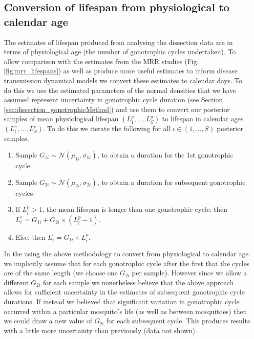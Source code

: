 \documentclass[12pt]{article}
\begin{document}
{\subsection{Conversion of lifespan from physiological to calendar age}\label{sec:dissection_conversion}
The estimates of lifespan produced from analysing the dissection data are in terms of physiological age (the number of gonotrophic cycles undertaken). To allow comparison with the estimates from the MRR studies (Fig. \ref{fig:mrr_lifespans}) as well as produce more useful estimates to inform disease transmission dynamical models we convert these estimates to calendar days. To do this we use the estimated parameters of the normal densities that we have assumed represent uncertainty in gonotrophic cycle duration (see Section \ref{sec:dissection_gonotrophicMethod}) and use them to convert our posterior samples of mean physiological lifespan $(L^p_1,...,L^p_S)$ to lifespan in calendar ages $(L^c_1,...,L^c_S)$. To do this we iterate the following for all $i\in (1,...,S)$ posterior samples,

\begin{enumerate}
	\item Sample $G_{1i} \sim \mathcal{N}(\mu_{1i},\sigma_{1i})$, to obtain a duration for the 1st gonotrophic cycle.
	\item Sample $G_{2i} \sim \mathcal{N}(\mu_{2i},\sigma_{2i})$, to obtain a duration for subsequent gonotrophic cycles.
	\item If $L^p_i > 1$, the mean lifespan is longer than one gonotrophic cycle:
	\subitem then $L^c_i = G_{1i} + G_{2i} \times (L^p_i - 1)$.
	\item Else:
	\subitem then $L^c_i = G_{1i}\times L^p_i$.
\end{enumerate}

In the using the above methodology to convert from physiological to calendar age we implicitly assume that for each gonotrophic cycle after the first that the cycles are of the same length (we choose one $G_{2i}$ per sample). However since we allow a different $G_{2i}$ for each sample we nonetheless believe that the above approach allows for sufficient uncertainty in the estimates of subsequent gonotrophic cycle durations. If instead we believed that significant variation in gonotrophic cycle occurred within a particular mosquito's life (as well as between mosquitoes) then we could draw a new value of $G_{2i}$ for each subsequent cycle. This produces results with a little more uncertainty than previously (data not shown).

}
\end{document}
